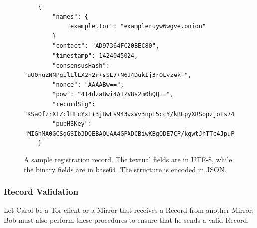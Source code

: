 \begin{figure}
	\begin{lstlisting}
	{
		"names": {
			"example.tor": "exampleruyw6wgve.onion"
		}
		"contact": "AD97364FC20BEC80",
		"timestamp": 1424045024,
		"consensusHash": "uU0nuZNNPgilLlLX2n2r+sSE7+N6U4DukIj3rOLvzek=",
		"nonce": "AAAABw==",
		"pow": "4I4dzaBwi4AIZW8s2m0hQQ==",
		"recordSig": 	"KSaOfzrXIZclHFcYxI+3jBwLs943wxVv3npI5ccY/kBEpyXRSopzjoFs746n0tJqUpdY4Kbe6DBwERaN7ELmSSK9Pu6q8QeKzNAh+QOnKl0fKBN7fqowjkQ3ktFkR0Vuox9WrrbNTMa4+up0Np52hlbKA3zSRz4fbR9NVlh6uuQ=",
		"pubHSKey": "MIGhMA0GCSqGSIb3DQEBAQUAA4GPADCBiwKBgQDE7CP/kgwtJhTTc4JpuPkvA7Ln9wgc+fgTKgkyUp1zusxgUAn1c1MGx4YhO42KPB7dyZOf3pcRk94XsYFY1ULkF2+tf9KdNe7GFzJyMFCQENnUcVXbcwLH4vAeiGK7R/nScbCbyc9LT+VE1fbKchTL1QzLVBLqJTxhR+9YPi8x+QIFAdZ8BJs="
	}
	\end{lstlisting}
	\caption{A sample registration record. The textual fields are in UTF-8, while the binary fields are in base64. The structure is encoded in JSON.}
	\label{fig:sampleRecord}
\end{figure}

\subsubsection{Record Validation}

Let Carol be a Tor client or a Mirror that receives a Record from another Mirror. Bob must also perform these procedures to ensure that he sends a valid Record.

